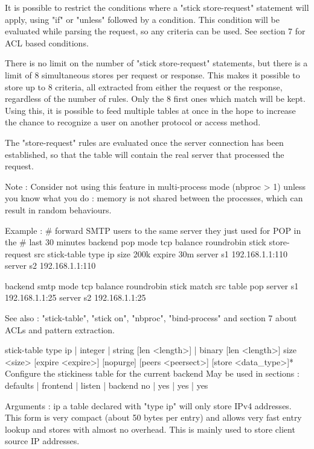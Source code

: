   It is possible to restrict the conditions where a "stick store-request"
  statement will apply, using "if" or "unless" followed by a condition. This
  condition will be evaluated while parsing the request, so any criteria can be
  used. See section 7 for ACL based conditions.

  There is no limit on the number of "stick store-request" statements, but
  there is a limit of 8 simultaneous stores per request or response. This
  makes it possible to store up to 8 criteria, all extracted from either the
  request or the response, regardless of the number of rules. Only the 8 first
  ones which match will be kept. Using this, it is possible to feed multiple
  tables at once in the hope to increase the chance to recognize a user on
  another protocol or access method.

  The "store-request" rules are evaluated once the server connection has been
  established, so that the table will contain the real server that processed
  the request.

  Note : Consider not using this feature in multi-process mode (nbproc > 1)
         unless you know what you do : memory is not shared between the
         processes, which can result in random behaviours.

  Example :
    # forward SMTP users to the same server they just used for POP in the
    # last 30 minutes
    backend pop
        mode tcp
        balance roundrobin
        stick store-request src
        stick-table type ip size 200k expire 30m
        server s1 192.168.1.1:110
        server s2 192.168.1.1:110

    backend smtp
        mode tcp
        balance roundrobin
        stick match src table pop
        server s1 192.168.1.1:25
        server s2 192.168.1.1:25

  See also : "stick-table", "stick on", "nbproc", "bind-process" and section 7
             about ACLs and pattern extraction.


stick-table type {ip | integer | string [len <length>] | binary [len <length>]}
            size <size> [expire <expire>] [nopurge] [peers <peersect>]
            [store <data_type>]*
  Configure the stickiness table for the current backend
  May be used in sections :   defaults | frontend | listen | backend
                                 no    |    yes   |   yes  |   yes

  Arguments :
    ip         a table declared with "type ip" will only store IPv4 addresses.
               This form is very compact (about 50 bytes per entry) and allows
               very fast entry lookup and stores with almost no overhead. This
               is mainly used to store client source IP addresses.

